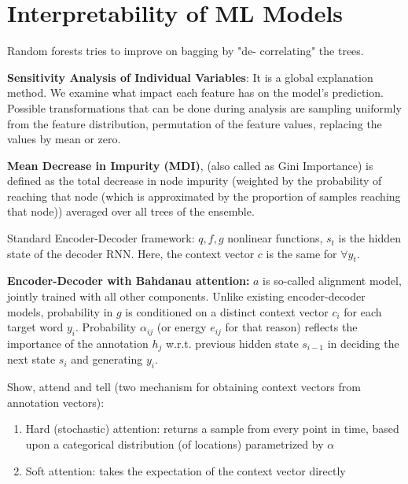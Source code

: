 \documentclass[11pt]{article}
\newcommand{\ulb}{\begin{enumerate}[label=\textbullet,topsep=0pt,itemsep=-0.5ex,partopsep=1ex,parsep=1ex]}
\newcommand{\ule}{\end{enumerate}\vspace{1mm}}
\begin{document}
\section{Interpretability of ML Models}
\par Random forests tries to improve on bagging by "de- correlating" the trees.
\par \textbf{Sensitivity Analysis of Individual Variables}: It is a global explanation method. We examine what impact each feature has on the model's prediction. Possible transformations that can be done during analysis are sampling uniformly from the feature distribution, permutation of the feature values, replacing the values by mean or zero.
\par \textbf{Mean Decrease in Impurity (MDI)}, (also called as Gini Importance) is defined as the total decrease in node impurity (weighted by the probability of reaching that node (which is approximated by the proportion of samples reaching that node)) averaged over all trees of the ensemble.
\par Standard Encoder-Decoder framework: $q,f,g$ nonlinear functions, $s_t$ is the hidden state of the decoder RNN. Here, the context vector $c$ is the same for $\forall y_t$.
\par \textbf{Encoder-Decoder with Bahdanau attention:} $a$ is so-called alignment model, jointly trained with all other components. Unlike existing encoder-decoder models, probability in $g$ is conditioned on a distinct context vector $c_i$ for each target word $y_i$. Probability $\alpha_{ij}$ (or energy $e_{ij}$ for that reason) reflects the importance of the annotation $h_{j}$ w.r.t. previous hidden state $s_{i-1}$ in deciding the next state $s_i$ and generating $y_i$.
\par Show, attend and tell (two mechanism for obtaining context vectors from annotation vectors):
\ulb
\item Hard (stochastic) attention: returns a sample from every point in time, based upon a categorical distribution (of locations) parametrized by $\alpha$
\item Soft attention: takes the expectation of the context vector directly
\ule
\end{document}
